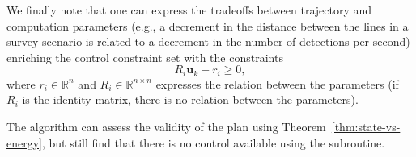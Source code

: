 \documentclass[letterpaper,10pt,conference]{ieeeconf}
\theoremstyle{definition}
\begin{document}
We finally note that one can express the tradeoffs between trajectory and computation parameters (e.g., a decrement in the distance between the lines in a survey scenario is related to a decrement in the number of detections per second) enriching the control constraint set with the constraints
\begin{equation*}
  R_i\mathbf{u}_k-r_i\geq 0,
\end{equation*}
where $r_i\in\mathbb{R}^n$ and $R_i\in\mathbb{R}^{n\times n}$ expresses the relation between the parameters (if $R_i$ is the identity matrix, there is no relation between the parameters).

The algorithm can assess the validity of the plan using Theorem~\ref{thm:state-vs-energy}, but still find that there is no control available using the subroutine.


\end{document}
